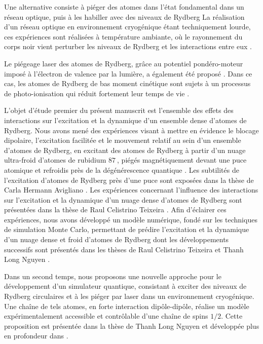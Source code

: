 Une alternative consiste à piéger des atomes dans l'état fondamental dans un réseau optique, puis à les habiller avec des niveaux de Rydberg \cite{Johnson2010,Zeiher2016,Bijnen2015,Glaetzle2015,Macri2014}
La réalisation d'un réseau optique en environnement cryogénique étant techniquement lourde, ces expériences sont réalisées à température ambiante, où le rayonnement du corps noir vient perturber les niveaux de Rydberg et les interactions entre eux \cite{MX_PORTORYDDRESS16,zeiher2016many}.

Le piégeage laser des atomes de Rydberg, grâce au potentiel pondéro-moteur imposé à l'électron de valence par la lumière, a également été proposé \cite{MX_RAITHELTRAP00}.
Dans ce cas, les atomes de Rydberg de bas moment cinétique sont sujets à un processus de photo-ionisation qui réduit fortement leur temps de vie \cite{MX_RAITHELPHOTION13}.

\bigskip
L'objet d'étude premier du présent manuscrit est l'ensemble des effets des interactions sur l'excitation et la dynamique d'un ensemble dense d'atomes de Rydberg.
Nous avons mené des expériences visant à mettre en évidence le blocage dipolaire, l'excitation facilitée et le mouvement relatif au sein d'un ensemble d'atomes de Rydberg, en excitant des atomes de Rydberg à partir d'un nuage ultra-froid d'atomes de rubidium $\SI{87}{}$, piégés magnétiquement devant une puce atomique et refroidis près de la dégénérescence quantique \cite{ENS_CHIPSPECTRO14,ENS_CHIPINTERACTION15}.
Les subtilités de l'excitation d'atomes de Rydberg près d'une puce sont exposées dans la thèse de Carla Hermann Avigliano \cite{PHD_HERMANN}.
Les expériences concernant l'influence des interactions sur l'excitation et la dynamique d'un nuage dense d'atomes de Rydberg sont présentées dans la thèse de Raul Celistrino Teixeira \cite{PHD_CELISTRINO}.
Afin d'éclairer ces expériences, nous avons développé un modèle numérique, fondé sur les techniques de simulation Monte Carlo, permettant de prédire l'excitation et la dynamique d'un nuage dense et froid d'atomes de Rydberg dont les développements successifs sont présentés dans les thèses de Raul Celistrino Teixeira \cite{PHD_CELISTRINO} et Thanh Long Nguyen \cite{PHD_NGUYEN}.

\bigskip
Dans un second temps, nous proposons une nouvelle approche pour le développement d'un simulateur quantique, consistant à exciter des niveaux de Rydberg circulaires et à les piéger par laser dans un environnement cryogénique.
Une chaîne de tels atomes, en forte interaction dipôle-dipôle,  réalise un modèle expérimentalement accessible et contrôlable d'une chaîne de spins $1/2$.
Cette proposition est présentée dans la thèse de Thanh Long Nguyen \cite{PHD_NGUYEN} et développée plus en profondeur dans \cite{ENS_PRE_CIRCSIM}.

